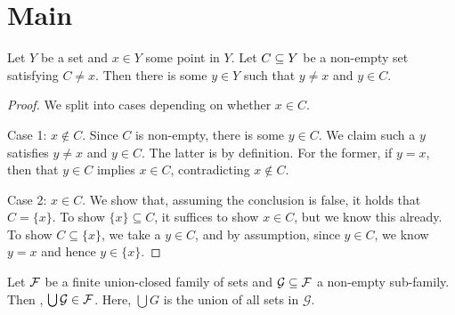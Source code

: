 %

\chapter{Main}

\begin{lemma} \label{small_lemma}
\leanok

Let $Y$ be a set and $x \in Y$ some point in $Y$. Let $C \subseteq Y$ be a non-empty set satisfying $C \ne {x}$. Then there is some $y \in Y$ such that $y \ne x$ and $y \in C$.
\end{lemma}

\begin{proof}
\leanok 

We split into cases depending on whether $x \in C$.

\vs

Case 1: $x \not \in C$. Since $C$ is non-empty, there is some $y \in C$. 
We claim such a $y$ satisfies $y \ne x$ and $y \in C$. The latter is by definition.
For the former, if $y = x$, then that $y \in C$ implies $x \in C$, contradicting $x \not \in C$.

\vs

Case 2: $x \in C$. We show that, assuming the conclusion is false, it holds that $C = \{x\}$. 
To show $\{x\} \subseteq C$, it suffices to show $x \in C$, but we know this already. To show
$C \subseteq \{x\}$, we take a $y \in C$, and by assumption, since $y \in C$, we know $y = x$
and hence $y \in \{x\}$.
\end{proof}


\vsss

\begin{proposition} \label{UGinF}
\leanok
Let $\mathcal{F}$ be a finite union-closed family of sets and $\mathcal{G} \subseteq \mathcal{F}$ a non-empty sub-family. Then , $\bigcup \mathcal{G} \in \mathcal{F}$. Here, $\bigcup G$ is the union of all sets in $\mathcal{G}$. 
\end{proposition}

